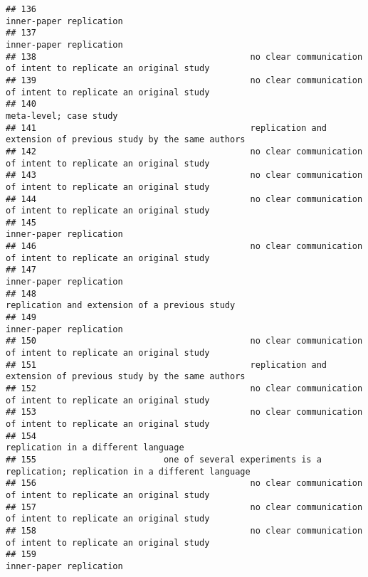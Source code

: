 \documentclass[
  english,
  man]{apa6}
\begin{document}
\begin{verbatim}
## 136                                                                                  inner-paper replication
## 137                                                                                  inner-paper replication
## 138                                          no clear communication of intent to replicate an original study
## 139                                          no clear communication of intent to replicate an original study
## 140                                                                                   meta-level; case study
## 141                                          replication and extension of previous study by the same authors
## 142                                          no clear communication of intent to replicate an original study
## 143                                          no clear communication of intent to replicate an original study
## 144                                          no clear communication of intent to replicate an original study
## 145                                                                                  inner-paper replication
## 146                                          no clear communication of intent to replicate an original study
## 147                                                                                  inner-paper replication
## 148                                                            replication and extension of a previous study
## 149                                                                                  inner-paper replication
## 150                                          no clear communication of intent to replicate an original study
## 151                                          replication and extension of previous study by the same authors
## 152                                          no clear communication of intent to replicate an original study
## 153                                          no clear communication of intent to replicate an original study
## 154                                                                      replication in a different language
## 155                         one of several experiments is a replication; replication in a different language
## 156                                          no clear communication of intent to replicate an original study
## 157                                          no clear communication of intent to replicate an original study
## 158                                          no clear communication of intent to replicate an original study
## 159                                                                                  inner-paper replication

\end{verbatim}
\end{document}
